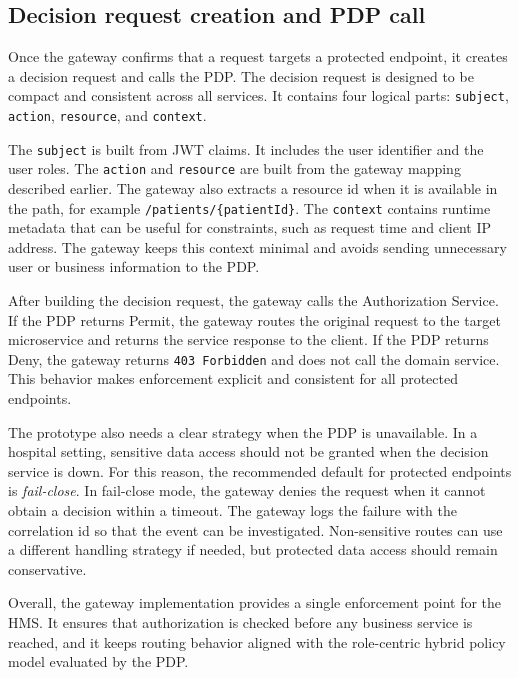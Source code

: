 \subsection{Decision request creation and PDP call}
\label{subsec:gateway_pdp_call}

Once the gateway confirms that a request targets a protected endpoint, it creates a decision request and calls the PDP.
The decision request is designed to be compact and consistent across all services. It contains four logical parts:
\texttt{subject}, \texttt{action}, \texttt{resource}, and \texttt{context}.
\vspace{0.5cm}


The \texttt{subject} is built from JWT claims. It includes the user identifier and the user roles. The \texttt{action} and
\texttt{resource} are built from the gateway mapping described earlier. The gateway also extracts a resource id when it is
available in the path, for example \texttt{/patients/\{patientId\}}. The \texttt{context} contains runtime metadata that can
be useful for constraints, such as request time and client IP address. The gateway keeps this context minimal and avoids
sending unnecessary user or business information to the PDP.
\vspace{0.5cm}


After building the decision request, the gateway calls the Authorization Service. If the PDP returns Permit, the gateway
routes the original request to the target microservice and returns the service response to the client. If the PDP returns
Deny, the gateway returns \texttt{403 Forbidden} and does not call the domain service. This behavior makes enforcement
explicit and consistent for all protected endpoints.
\vspace{0.5cm}


The prototype also needs a clear strategy when the PDP is unavailable. In a hospital setting, sensitive data access should
not be granted when the decision service is down. For this reason, the recommended default for protected endpoints is
\textit{fail-close}. In fail-close mode, the gateway denies the request when it cannot obtain a decision within a timeout.
The gateway logs the failure with the correlation id so that the event can be investigated. Non-sensitive routes can use a
different handling strategy if needed, but protected data access should remain conservative.
\vspace{0.5cm}


Overall, the gateway implementation provides a single enforcement point for the HMS. It ensures that authorization is
checked before any business service is reached, and it keeps routing behavior aligned with the role-centric hybrid policy
model evaluated by the PDP.

